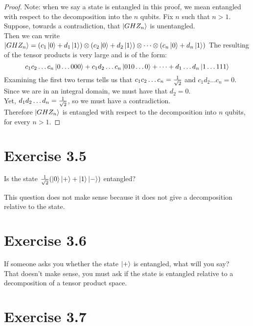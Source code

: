 \documentclass[11pt]{article}
\def\srtt{\ensuremath\frac{1}{\sqrt{2}}}
\begin{document}
\begin{proof}
    Note: when we say a state is entangled in this proof, we mean entangled with respect to the decomposition into the $n$ qubits. 
    Fix $n$ such that $n>1$. \\ Suppose, towards a contradiction, that $\ket{GHZ_n}$ is unentangled. \\
    Then we can write $\ket{GHZ_n} = (c_1\ket{0} + d_1\ket{1}) \otimes (c_2\ket{0} + d_2\ket{1}) \otimes \cdots \otimes (c_n\ket{0} + d_n\ket{1})$
    The resulting of the tensor products is very large and is of the form: 
    $$c_1c_2\dots c_n\ket{0\dots000} + c_1d_2\dots c_n\ket{010\dots0} + \cdots + d_1\dots d_n\ket{1\dots111}$$
    Examining the first two terms tells us that $c_1c_2\dots c_n = \srtt$ and $c_1d_2\dots c_n = 0$. \\
    Since we are in an integral domain, we must have that $d_2 = 0$. \\
    Yet, $d_1d_2\dots d_n = \srtt$, so we must have a contradiction.  \\
    Therefore $\ket{GHZ_n}$ is entangled with respect to the decomposition into $n$ qubits, for every $n > 1$.
\end{proof}

\section*{Exercise 3.5}

Is the state $\srtt(\ket{0}\ket{+} + \ket{1}\ket{-})$ entangled?

This question does not make sense because it does not give a decomposition relative to the state.

\section*{Exercise 3.6}

If someone asks you whether the state $\ket{+}$ is entangled, what will you say?
\\
That doesn't make sense, you must ask if the state is entangled relative to a decomposition of a tensor product space.

\section*{Exercise 3.7}
\end{document}
